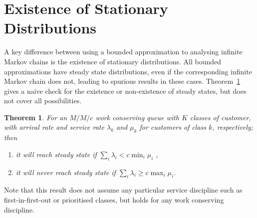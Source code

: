 \documentclass{article}
\newtheorem{theorem}{Theorem}
\begin{document}
\section{Existence of Stationary Distributions}\label{sec:stationary}
A key difference between using a bounded approximation to analysing infinite
Markov chains is the existence of stationary distributions. All bounded
approximations have steady state distributions, even if the corresponding
infinite Markov chain does not, leading to spurious results in these cases.
Theorem~\ref{thrm:steadystate} gives a naive check for the existence or
non-existence of steady states, but does not cover all possibilities.

\begin{theorem}\label{thrm:steadystate}
For an $M/M/c$ work conserving queue with $K$ classes of customer, with arrival
rate and service rate $\lambda_k$ and  $\mu_k$ for customers of class $k$,
respectively; then
\begin{enumerate}
  \item it will reach steady state if $\sum_i \lambda_i < c \min_i \mu_i$ ,
  \item it will never reach steady state if $\sum_i \lambda_i \geq c \max_i \mu_i$.
\end{enumerate}
\end{theorem}

Note that this result does not assume any particular service discipline such as
first-in-first-out or prioritised classes, but holds for any work conserving
discipline.
\end{document}
